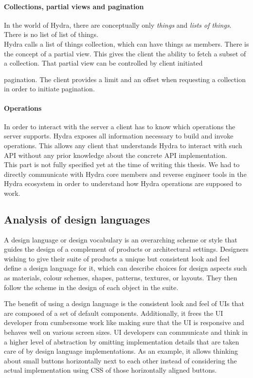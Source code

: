 \paragraph{Collections, partial views and pagination}
In the world of Hydra, there are conceptually only \textit{things} and \textit{lists of things}. There is no list of list of things. \\
Hydra calls a list of things collection, which can have things as members. There is the concept of a partial view. This gives the client the ability to fetch a subset of a collection. That partial view can be controlled by client initiated {\gls{pagination}. The client provides a limit and an offset when requesting a collection in order to initiate pagination.

\paragraph{Operations}
In order to interact with the server a client has to know which operations the server supports. Hydra exposes all information necessary to build and invoke operations. This allows any client that understands Hydra to interact with such API without any prior knowledge about the concrete API implementation. \\
This part is not fully specified yet at the time of writing this thesis. We had to directly communicate with Hydra core members and reverse engineer tools in the Hydra ecosystem in order to understand how Hydra operations are supposed to work.

\subsection{Analysis of design languages}
A design language or design vocabulary is an overarching scheme or style that guides the design of a complement of products or architectural settings. Designers wishing to give their suite of products a unique but consistent look and feel define a design language for it, which can describe choices for design aspects such as materials, colour schemes, shapes, patterns, textures, or layouts. They then follow the scheme in the design of each object in the suite. \citep{designlanguage}

The benefit of using a design language is the consistent look and feel of UIs that are composed of a set of default components. Additionally, it frees the UI developer from cumbersome work like making sure that the UI is responsive and behaves well on various screen sizes. UI developers can communicate and think in a higher level of abstraction by omitting implementation details that are taken care of by design language implementations. As an example, it allows thinking about small buttons horizontally next to each other instead of considering the actual implementation using CSS of those horizontally aligned buttons.

}
